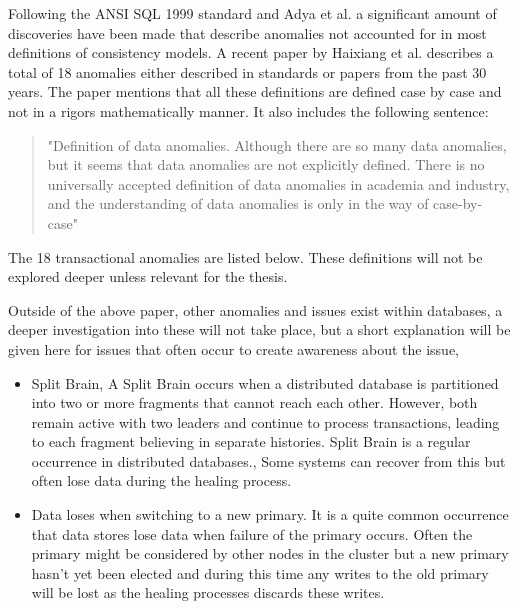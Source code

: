 \documentclass[a4paper,10pt,titlepage]{report}
\begin{document}
Following the ANSI SQL 1999\cite{ansisql1999} standard and Adya et al. \cite{Adya99weakconsistency} a significant amount of discoveries have been made that describe anomalies not accounted for in most definitions of consistency models. A recent paper by Haixiang et al. \cite{li2021coo} describes a total of 18 anomalies either described in standards or papers from the past 30 years. The paper mentions that all these definitions are defined case by case and not in a rigors mathematically manner. It also includes the following sentence: 
\begin{quote}
    "Definition of data anomalies. Although there are so many data anomalies, but it seems that data anomalies are not explicitly defined. There is no universally accepted definition of data anomalies in academia and industry, and the understanding of data anomalies is only in the way of case-by-case" \cite{li2021coo}
\end{quote}

The 18 transactional anomalies are listed below. These definitions will not be explored deeper unless relevant for the thesis.

\vspace{2mm}

\vspace{2mm}

Outside of the above paper, other anomalies and issues exist within databases, a deeper investigation into these will not take place, but a short explanation will be given here for issues that often occur to create awareness about the issue,
\begin{itemize}
    \item Split Brain, A Split Brain occurs when a distributed database is partitioned into two or more fragments that cannot reach each other. However, both remain active with two leaders and continue to process transactions, leading to each fragment believing in separate histories. Split Brain is a regular occurrence in distributed databases.\cite{aphyrelasticsearch, jepsenscylla, jepsenhazelcast}, Some systems can recover from this but often lose data during the healing process.
    \item Data loses when switching to a new primary. It is a quite common occurrence that data stores lose data when failure of the primary occurs. Often the primary might be considered by other nodes in the cluster but a new primary hasn't yet been elected and during this time any writes to the old primary will be lost as the healing processes discards these writes.
\end{itemize}
\end{document}
